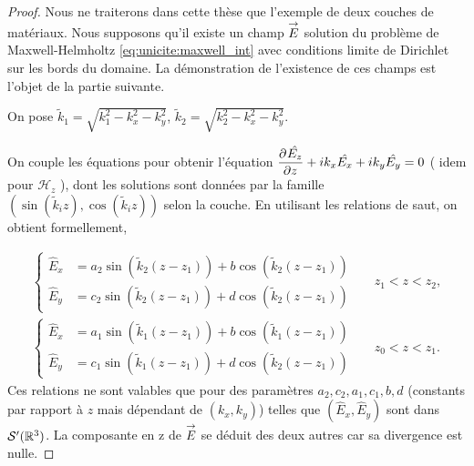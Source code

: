     \begin{proof}
      Nous ne traiterons dans cette thèse que l'exemple de deux couches de matériaux.
      Nous supposons qu'il existe un champ \(\vE\) solution du problème de Maxwell-Helmholtz \eqref{eq:unicite:maxwell_int} avec conditions limite de Dirichlet sur les bords du domaine.
      La démonstration de l'existence de ces champs est l'objet de la partie suivante.

      \newcommand{\kk}{\tilde{k}}

      On pose \(\kk_1 = \sqrt{k_1^2 - k_x^2 - k_y^2}\),  \(\kk_2 = \sqrt{k_2^2 - k_x^2 - k_y^2}\).

      On couple les équations pour obtenir l'équation \(\ddr{z}{\hat{E_z}} + ik_x \hat{E_x} + ik_y\hat{E_y} = 0\) ( idem pour \(\mathcal{H}_z\) ), dont les solutions sont données par la famille \((\sin(\kk_i z),\cos(\kk_i z))\) selon la couche.
      En utilisant les relations de saut, on obtient formellement,

      \begin{align*}
        \left\lbrace
        \begin{aligned}
          \hat{E}_x &= a_2\sin(\kk_2(z-z_1)) +  b\cos(\kk_2(z-z_1))
          \\
          \hat{E}_y &= c_2\sin(\kk_2(z-z_1)) +  d\cos(\kk_2(z-z_1))
        \end{aligned}
        \right. && z_1 < z < z_2,
        \\
        \left\lbrace
        \begin{aligned}
          \hat{E}_x &= a_1\sin(\kk_1(z-z_1)) +  b\cos(\kk_1(z-z_1))
          \\
          \hat{E}_y &= c_1\sin(\kk_1(z-z_1)) +  d\cos(\kk_2(z-z_1))
        \end{aligned}
        \right. && z_0 < z < z_1.
      \end{align*}
      Ces relations ne sont valables que pour des paramètres \(a_2,c_2,a_1,c_1,b,d\) (constants par rapport à \(z\) mais dépendant de \((k_x,k_y)\)) telles que \((\hat{E}_x,\hat{E}_y)\) sont dans \(\mathcal{S}'(\RR^3)\).
      La composante en z de \(\vE\) se déduit des deux autres car sa divergence est nulle.



\end{proof}
